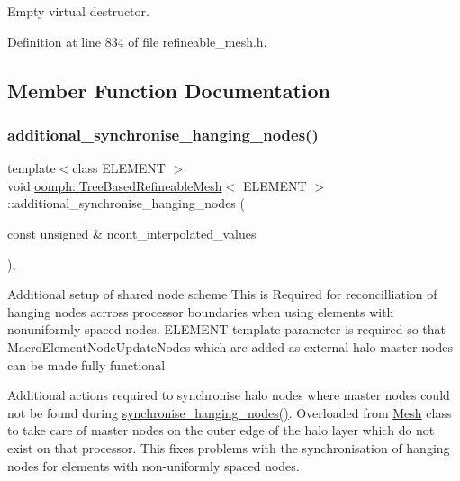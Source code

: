 Empty virtual destructor. 



Definition at line 834 of file refineable\+\_\+mesh.\+h.



\subsection{Member Function Documentation}
\mbox{\label{classoomph_1_1TreeBasedRefineableMesh_a1af8d6a53048bd0d376f6a56bbd4c125}} 
\subsubsection{\texorpdfstring{additional\+\_\+synchronise\+\_\+hanging\+\_\+nodes()}{additional\_synchronise\_hanging\_nodes()}}
{\footnotesize\ttfamily template$<$class E\+L\+E\+M\+E\+NT $>$ \\
void \hyperlink{classoomph_1_1TreeBasedRefineableMesh}{oomph\+::\+Tree\+Based\+Refineable\+Mesh}$<$ E\+L\+E\+M\+E\+NT $>$\+::additional\+\_\+synchronise\+\_\+hanging\+\_\+nodes (\begin{DoxyParamCaption}\item[{const unsigned \&}]{ncont\+\_\+interpolated\+\_\+values }\end{DoxyParamCaption})\hspace{0.3cm}{\ttfamily [protected]}, {\ttfamily [virtual]}}

Additional setup of shared node scheme This is Required for reconcilliation of hanging nodes acrross processor boundaries when using elements with nonuniformly spaced nodes. E\+L\+E\+M\+E\+NT template parameter is required so that Macro\+Element\+Node\+Update\+Nodes which are added as external halo master nodes can be made fully functional

Additional actions required to synchronise halo nodes where master nodes could not be found during \hyperlink{classoomph_1_1TreeBasedRefineableMeshBase_a0ba902eb4b63aaa8c4da1aadcf25709a}{synchronise\+\_\+hanging\+\_\+nodes()}. Overloaded from \hyperlink{classoomph_1_1Mesh}{Mesh} class to take care of master nodes on the outer edge of the halo layer which do not exist on that processor. This fixes problems with the synchronisation of hanging nodes for elements with non-\/uniformly spaced nodes. 

